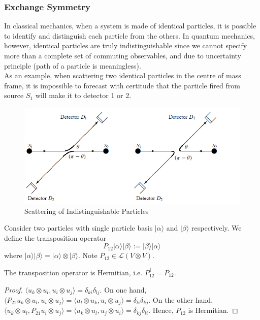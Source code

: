 \documentclass[a4paper]{article}
\begin{document}
\subsubsection*{Exchange Symmetry}
\begin{Note}
In classical mechanics, when a system is made of identical particles, it is possible to identify and distinguish each particle from the others. In quantum mechanics, however, identical particles are truly indistinguishable since we cannot specify more than a complete set of commuting observables, and due to uncertainty principle (path of a particle is meaningless).\\[5pt]
As an example, when scattering two identical particles in the centre of mass frame, it is impossible to forecast with certitude that the particle fired from source $S_1$ will make it to detector 1 or 2. 
\end{Note}
\begin{figure}[H]
    \centering
    \includegraphics[width=\linewidth]{indistinguishable.PNG}
    \caption{Scattering of Indistinguishable Particles}
\end{figure}
\begin{defi}
Consider two particles with single particle basis $|\alpha\rangle$ and $|\beta\rangle$ respectively. We define the transposition operator
$$P_{12}|\alpha\rangle|\beta\rangle:=|\beta\rangle|\alpha\rangle$$
where $|\alpha\rangle|\beta\rangle=|\alpha\rangle\otimes|\beta\rangle$. Note $P_{12}\in\mathcal{L}(V\otimes V)$.
\end{defi}
\begin{thm}
The transposition operator is Hermitian, i.e. $P_{12}^\dag=P_{12}$.
\end{thm}
\begin{proof}
$\langle u_k\otimes u_l,u_i\otimes u_j\rangle=\delta_{ki}\delta_{lj}$. On one hand, $\langle P_{21}u_k\otimes u_l,u_i\otimes u_j\rangle=\langle u_l\otimes u_k,u_i\otimes u_j\rangle=\delta_{li}\delta_{kj}$. On the other hand, $\langle u_k\otimes u_l,P_{21}u_i\otimes u_j\rangle=\langle u_k\otimes u_l,u_j\otimes u_i\rangle=\delta_{kj}\delta_{li}$. Hence, $P_{12}$ is Hermitian. 
\end{proof}
\end{document}
